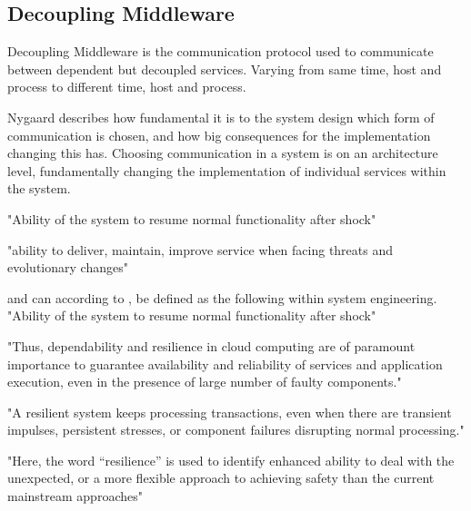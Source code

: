 \subsection{Decoupling Middleware}
Decoupling Middleware is the communication protocol used to communicate between dependent but decoupled services. Varying from same time, host and process to different time, host and process.

Nygaard describes how fundamental it is to the system design which form of communication is chosen, and how big consequences for the implementation changing this has. Choosing communication in a system is on an architecture level, fundamentally changing the implementation of individual services within the system.


\begin{quote_highlight}
"Ability of the system to resume normal functionality after shock"\cite[p. 15]{omer2013resilience}
\end{quote_highlight}

\begin{quote_highlight}
"ability to deliver, maintain, improve service when facing threats and evolutionary changes" \cite[p. 4]{strigini2012fault}
\end{quote_highlight}


and can according to \cite[p. 15]{omer2013resilience}, be defined as the following within system engineering. "Ability of the system to resume normal functionality after shock"\cite[p. 15]{omer2013resilience}

"Thus, dependability and resilience in cloud computing are of paramount importance to guarantee availability and reliability of services and application execution, even in the presence of large number of faulty components." \citeauthor{abid2014toward}

\begin{quote_highlight}
"A resilient system keeps processing transactions, even when there are transient impulses, persistent stresses, or component failures disrupting normal processing." \cite[p. 24]{nygard2007release}
\end{quote_highlight}


"Here, the word “resilience” is used to identify enhanced ability to deal with the unexpected, or a more flexible approach to achieving safety than the current mainstream approaches"  \cite[p. 5]{strigini2012fault}

